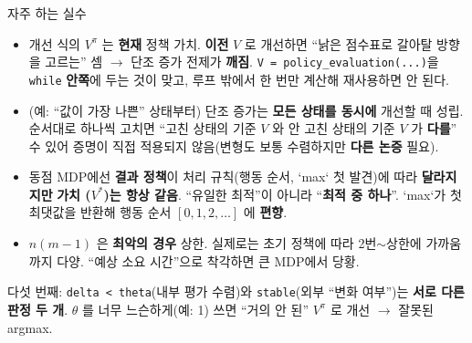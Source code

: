 \documentclass[aspectratio=169,11pt]{beamer}
\begin{document}
\begin{frame}{자주 하는 실수}
  \begin{itemize}
    \item {} 개선 식의 $V^\pi$ 는 \textbf{현재} 정책
      가치. \textbf{이전} $V$ 로 개선하면 ``낡은 점수표로
      갈아탈 방향을 고르는'' 셈 $\to$ 단조 증가 전제가 \textbf{깨짐}.
      \texttt{V = policy\_evaluation(...)}을 \texttt{while}
      \textbf{안쪽}에 두는 것이 맞고, 루프 밖에서 한 번만 계산해
      재사용하면 안 된다.
    \item {} (예: ``값이
      가장 나쁜'' 상태부터) 단조 증가는 \textbf{모든 상태를
      동시에} 개선할 때 성립. 순서대로 하나씩 고치면 ``고친
      상태의 기준 $V$ 와 안 고친 상태의 기준 $V$ 가 \textbf{다를}''
      수 있어 증명이 직접 적용되지 않음(변형도 보통 수렴하지만
      \textbf{다른 논증} 필요).
    \item {}
      동점 MDP에선 \textbf{결과 정책}이 처리 규칙(행동 순서,
      `max` 첫 발견)에 따라 \textbf{달라지지만} \textbf{가치
      ($V^{*}$)는 항상 같음}. ``유일한 최적''이 아니라
      ``\textbf{최적 중 하나}''. `max`가 첫 최댓값을 반환해
      행동 순서 $[0,1,2,\ldots]$ 에 \textbf{편향}.
    \item {}
      $n(m{-}1)$ 은 \textbf{최악의 경우} 상한. 실제로는 초기
      정책에 따라 2번$\sim$상한에 가까움까지 다양. ``예상 소요
      시간''으로 착각하면 큰 MDP에서 당황.
  \end{itemize}
  {\footnotesize 다섯 번째: \texttt{delta < theta}(내부 평가
  수렴)와 \texttt{stable}(외부 ``변화 여부'')는 \textbf{서로
  다른 판정 두 개}. $\theta$ 를 너무 느슨하게(예: 1) 쓰면
  ``거의 안 된'' $V^\pi$ 로 개선 $\to$ 잘못된 argmax.}
\end{frame}
\end{document}
